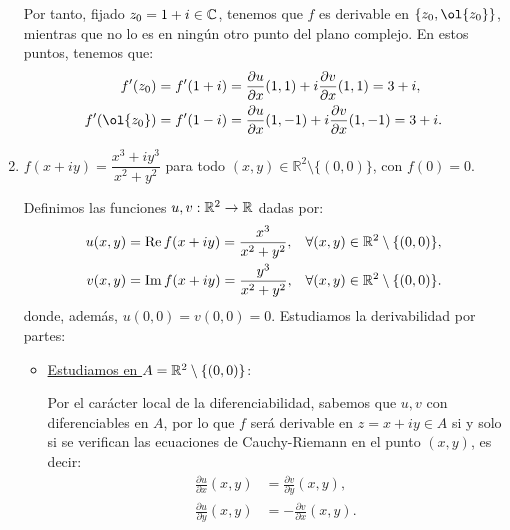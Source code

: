 \begin{ejercicio}
\begin{enumerate}
        Por tanto, fijado $z_0=1+i\in\mathbb{C}$, tenemos que $f$ es derivable en $\{z_0,\ol{z_0}\}$, mientras que no lo es en ningún otro punto del plano complejo. En estos puntos, tenemos que:
        \begin{align*}
            f'(z_0) &= f'(1+i) = \dfrac{\partial u}{\partial x}(1,1) + i\dfrac{\partial v}{\partial x}(1,1) = 3+i,\\
            f'(\ol{z_0}) &= f'(1-i) = \dfrac{\partial u}{\partial x}(1,-1) + i\dfrac{\partial v}{\partial x}(1,-1) = 3+i.
        \end{align*}
        \item $f(x + iy) = \dfrac{x^3 + iy^3}{x^2 + y^2}$ para todo $(x, y) \in \mathbb{R}^2 \setminus \{(0, 0)\}$, con $f(0) = 0$.
        
        Definimos las funciones $u,v:\mathbb{R}^2\to\mathbb{R}$ dadas por:
        \begin{align*}
            u(x,y) &= \operatorname{Re} f(x+iy) = \dfrac{x^3}{x^2+y^2},&\forall (x,y)\in\mathbb{R}^2\setminus\{(0,0)\},\\
            v(x,y) &= \operatorname{Im} f(x+iy) = \dfrac{y^3}{x^2+y^2},&\forall (x,y)\in\mathbb{R}^2\setminus\{(0,0)\}.
        \end{align*}
        donde, además, $u(0,0)=v(0,0)=0$. Estudiamos la derivabilidad por partes:
        \begin{itemize}
            \item \ul{Estudiamos en $A=\mathbb{R}^2\setminus\{(0,0)\}$}:
            
            Por el carácter local de la diferenciabilidad, sabemos que $u,v$ con diferenciables en $A$, por lo que $f$ será derivable en $z=x+iy\in A$ si y solo si se verifican las ecuaciones de Cauchy-Riemann en el punto $(x,y)$, es decir:
            \begin{align*}
                \frac{\partial u}{\partial x}(x,y) &= \frac{\partial v}{\partial y}(x,y),\\
                \frac{\partial u}{\partial y}(x,y) &= -\frac{\partial v}{\partial x}(x,y).
            \end{align*}


\end{itemize}
\end{enumerate}
\end{ejercicio}
